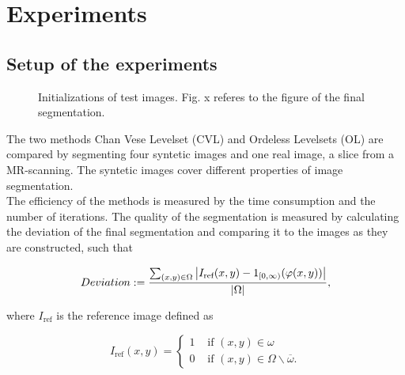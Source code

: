 
\chapter{Experiments}\label{chapter:experiments}
\section{Setup of the experiments}
\begin{figure}[h]
  \centering
  \caption{Initializations of test images. Fig. x referes to the figure of the final segmentation.}
\end{figure}

The two methods Chan Vese Levelset (CVL) and Ordeless Levelsets (OL) are compared by segmenting four syntetic images and one real image, a slice from a MR-scanning. The syntetic images cover different properties of image segmentation.\\
The efficiency of the methods is measured by the time consumption and the number of iterations. The quality of the segmentation is measured by calculating the deviation of the final segmentation and comparing it to the images as they are constructed, such that 

\begin{equation}
  Deviation := \frac{\sum_{(x,y)\in\Omega}\left| {I_{\text{ref}}(x,y)-1_{[0,\infty)}(\varphi(x,y))} \right|}{\left| {\Omega} \right|},
\end{equation}

where $I_{\text{ref}}$ is the reference image defined as

\begin{equation}
  I_{\text{ref}}(x,y) = \begin{cases}
    1 & \mbox{ if } (x,y)\in \omega\\
    0 & \mbox{ if } (x,y)\in \Omega\backslash\overline{\omega}.
  \end{cases}
\end{equation}

